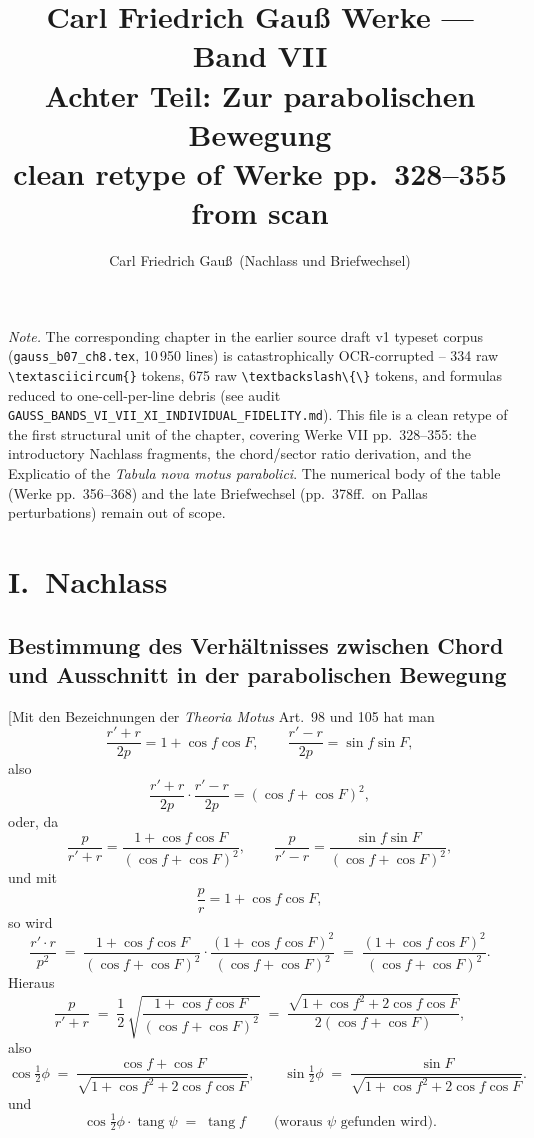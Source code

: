 \documentclass[11pt,a4paper]{article}
\title{Carl Friedrich Gau\ss{} Werke --- Band VII\\[0.4em]
\large Achter Teil: Zur parabolischen Bewegung\\
clean retype of Werke pp.\ 328--355 from scan}
\author{Carl Friedrich Gau\ss{}\ (Nachlass und Briefwechsel)}
\date{}
\newcommand{\tang}{\operatorname{tang}}
\begin{document}
\maketitle

\noindent\textit{Note.} The corresponding chapter in the earlier source draft v1 typeset
corpus (\verb|gauss_b07_ch8.tex|, 10\,950 lines) is catastrophically
OCR-corrupted -- 334 raw \verb|\textasciicircum{}| tokens, 675 raw
\verb|\textbackslash\{\}| tokens, and formulas reduced to one-cell-per-line
debris (see audit
\verb|GAUSS_BANDS_VI_VII_XI_INDIVIDUAL_FIDELITY.md|).
This file is a clean retype of the first structural unit of the
chapter, covering Werke VII pp.~328--355: the introductory Nachlass
fragments, the chord/sector ratio derivation, and the Explicatio of the
\textit{Tabula nova motus parabolici}. The numerical body of the table
(Werke pp.~356--368) and the late Briefwechsel (pp.~378ff.\ on Pallas
perturbations) remain out of scope.

\vspace{1em}

\section*{I.~Nachlass}
\subsection*{Bestimmung des Verh\"altnisses zwischen Chord und Ausschnitt
in der parabolischen Bewegung}

\medskip

[Mit den Bezeichnungen der \textit{Theoria Motus} Art.~98 und 105 hat man
\[
  \frac{r' + r}{2p}
   = 1 + \cos f\cos F,
  \qquad
  \frac{r' - r}{2p}
   = \sin f\sin F,
\]
also
\[
  \frac{r' + r}{2p} \cdot \frac{r' - r}{2p}
   = (\cos f + \cos F)^{2},
\]
oder, da
\[
  \frac{p}{r' + r}
   = \frac{1 + \cos f\cos F}{(\cos f + \cos F)^{2}},
  \qquad
  \frac{p}{r' - r}
   = \frac{\sin f \sin F}{(\cos f + \cos F)^{2}},
\]
und mit
\[
  \frac{p}{r}
   = 1 + \cos f \cos F,
\]
so wird
\[
  \frac{r' \cdot r}{p^{2}}
   \;=\; \frac{1 + \cos f \cos F}{(\cos f + \cos F)^{2}}
        \cdot \frac{(1 + \cos f \cos F)^{2}}{(\cos f + \cos F)^{2}}
   \;=\; \frac{(1 + \cos f \cos F)^{2}}{(\cos f + \cos F)^{2}}.
\]
Hieraus
\[
  \frac{p}{r' + r}
   \;=\; \frac{1}{2}\,\sqrt{\frac{1 + \cos f \cos F}{(\cos f + \cos F)^{2}}}
   \;=\; \frac{\sqrt{1 + \cos f^{2} + 2\cos f\cos F}}{2(\cos f + \cos F)},
\]
also
\[
  \cos\!\tfrac{1}{2}\phi
   \;=\; \frac{\cos f + \cos F}{\sqrt{1 + \cos f^{2} + 2\cos f\cos F}},
  \qquad
  \sin\!\tfrac{1}{2}\phi
   \;=\; \frac{\sin F}{\sqrt{1 + \cos f^{2} + 2\cos f\cos F}}.
\]
und
\[
  \cos\!\tfrac{1}{2}\phi \cdot \tang\psi \;=\; \tang f
  \qquad \text{(woraus $\psi$ gefunden wird)}.
\]
\end{document}
